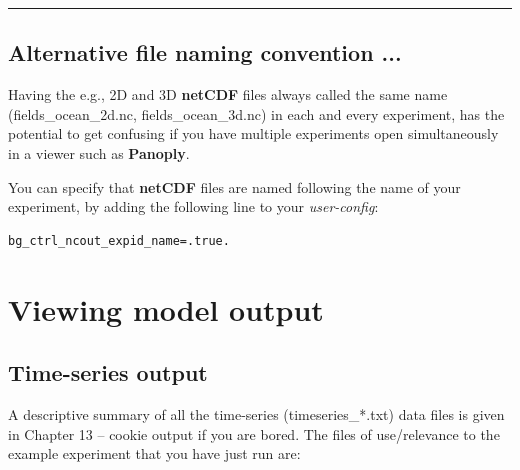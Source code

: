 \vspace{1mm}\noindent\rule{4cm}{0.5pt}\vspace{2mm}

\subsection*{Alternative file naming convention ...}

Having the e.g., 2D and 3D \textbf{netCDF} files always called the same name (\textsf{\footnotesize fields\_ocean\_2d.nc}, \textsf{\footnotesize fields\_ocean\_3d.nc}) in each and every experiment, has the potential to get confusing if you have multiple experiments open simultaneously in a viewer such as \textbf{Panoply}.

\vspace{1mm}
You can specify that \textbf{netCDF} files are named following the name of your experiment, by adding the following line to your \textit{user-config}:

\vspace{-1mm}\small\begin{verbatim}
bg_ctrl_ncout_expid_name=.true.
\end{verbatim}\normalsize\vspace{-1mm}

\newpage

\section{Viewing model output}


\subsection{Time-series output}

A descriptive summary of all the time-series (\textsf{\footnotesize timeseries\_*.txt}) data files is given in \textsf{\footnotesize Chapter 13 -- cookie output} if you are bored. The files of use/relevance to the example experiment that you have just run are:

